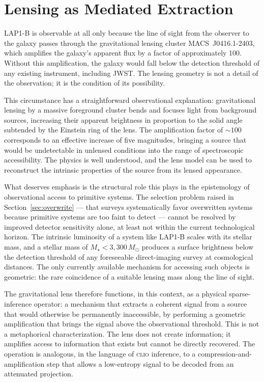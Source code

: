 \documentclass[12pt, a4paper]{article}
\newcommand{\Msun}{M_{\odot}}
\newcommand{\Mstar}{M_{\star}}
\newcommand{\CLIO}{\textsc{clio}}
\theoremstyle{definition}
\begin{document}
\section{Lensing as Mediated Extraction}
\label{sec:mediation}

LAP1-B is observable at all only because the line of sight from the observer
to the galaxy passes through the gravitational lensing cluster MACS~J0416.1-2403,
which amplifies the galaxy's apparent flux by a factor of approximately 100.
Without this amplification, the galaxy would fall below the detection threshold
of any existing instrument, including JWST. The lensing geometry is not a
detail of the observation; it is the condition of its possibility.

This circumstance has a straightforward observational explanation: gravitational
lensing by a massive foreground cluster bends and focuses light from background
sources, increasing their apparent brightness in proportion to the solid angle
subtended by the Einstein ring of the lens. The amplification factor of $\sim
100$ corresponds to an effective increase of five magnitudes, bringing a
source that would be undetectable in unlensed conditions into the range of
spectroscopic accessibility. The physics is well understood, and the lens
model can be used to reconstruct the intrinsic properties of the source from
its lensed appearance.

What deserves emphasis is the structural role this plays in the epistemology
of observational access to primitive systems. The selection problem raised in
Section~\ref{sec:overwrite} --- that surveys systematically favor overwritten
systems because primitive systems are too faint to detect --- cannot be
resolved by improved detector sensitivity alone, at least not within the
current technological horizon. The intrinsic luminosity of a system like
LAP1-B scales with its stellar mass, and a stellar mass of $\Mstar < 3{,}300\,
\Msun$ produces a surface brightness below the detection threshold of any
foreseeable direct-imaging survey at cosmological distances. The only currently
available mechanism for accessing such objects is geometric: the rare coincidence
of a suitable lensing mass along the line of sight.

The gravitational lens therefore functions, in this context, as a physical
sparse-inference operator: a mechanism that extracts a coherent signal from
a source that would otherwise be permanently inaccessible, by performing a
geometric amplification that brings the signal above the observational threshold.
This is not a metaphorical characterization. The lens does not create
information; it amplifies access to information that exists but cannot be
directly recovered. The operation is analogous, in the language of \CLIO{}
inference, to a compression-and-amplification step that allows a low-entropy
signal to be decoded from an attenuated projection.
\end{document}
